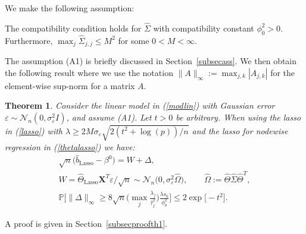 \documentclass[aos,MSNbibl,dvips]{arximspdf}
\def\cal{\mathcal}
\newtheorem{theo}{Theorem}[section]
\newcommand{\PP}{\mathbb{P}}
\newcommand{\eps}{\varepsilon}
\newcommand{\bx}{\mathbf{X}}
\begin{document}
We make the
following assumption:
%
\begin{longlist}[(A1)]
%
\item[(A1)] The compatibility condition holds for $\hat{\Sigma}$ with
compatibility constant \mbox{$\phi_0^2> 0$}. Furthermore, $\max_j \hat
{\Sigma
}_{j,j} \le M^2
$ for some $0 < M < \infty$.
\end{longlist}
%
The assumption (A1) is briefly discussed in Section~\ref{subsecass}.
We then obtain the following result
where we use the notation $\|A\|_{\infty}:= \max_{j,k} |A_{j,k}|$ for
the element-wise sup-norm
for a matrix $A$.
%
\begin{theo}\label{th1}
Consider the linear model in (\ref{modlin}) with Gaussian error $\eps
\sim
{\cal N}_n(0,\sigma_{\eps}^2 I)$, and assume \textup{(A1)}. Let $t >0$ be arbitrary.
When using the lasso in
(\ref{lasso}) with $\lambda\ge2 M \sigma_{\eps} \sqrt{2(t^2 +
\log(p))/{n}}$ and
the lasso for nodewise regression in (\ref{thetalasso}) we have:
%
\begin{eqnarray*}
& \sqrt n \bigl( \hat{b}_{\mathrm{Lasso}} - \beta^0 \bigr) = W +
\Delta,&
\\
&  W= \hat{\Theta}_{\mathrm{Lasso}} \bx^T \eps/\sqrt n \sim{\cal
N}_n \bigl(0, \sigma_{\varepsilon}^2 \hat\Omega\bigr),\qquad
\hat\Omega:= \hat\Theta\hat\Sigma\hat\Theta^T,&
\\
&\displaystyle \PP \biggl[\|\Delta\|_{\infty} \ge8 \sqrt n \biggl( \max
_j \frac
{\lambda_j }{ \hat\tau_j^2} \biggr) \frac{\lambda s_0}{\phi_0^2 } \biggr] \le2
\exp\bigl[-{t^2}\bigr].&
\end{eqnarray*}
%
\end{theo}
%
A proof is given in Section~\ref{subsecproofth1}.
\end{document}
